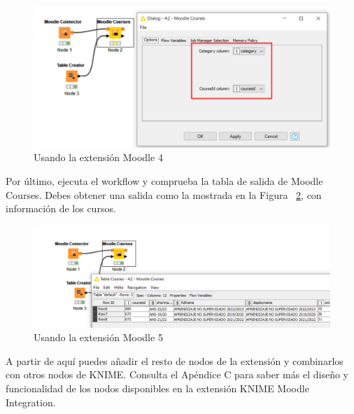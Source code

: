 \begin{figure}[!htb]
	\centering
	\includegraphics[width=1\textwidth]{img/manual_usuario_moodle_courses_config.png}
	\caption{Usando la extensión Moodle 4}
	\label{fig:extension4}
\end{figure}
\FloatBarrier

Por último, ejecuta el workflow y comprueba la tabla de salida de Moodle Courses. Debes obtener una 
salida como la mostrada en la Figura ~\ref{fig:extension5}, con información de los cursos.  

\begin{figure}[!htb]
	\centering
	\includegraphics[width=1\textwidth]{img/manual_usuario_moodle_courses_list.png}
	\caption{Usando la extensión Moodle 5}
	\label{fig:extension5}
\end{figure}
\FloatBarrier

A partir de aquí puedes añadir el resto de nodos de la extensión y combinarlos con otros nodos de KNIME. 
Consulta el Apéndice C para saber más el diseño y funcionalidad de los nodos disponibles en la extensión KNIME Moodle Integration. 

